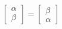 \documentclass[preview]{standalone}
\begin{document}
\begin{align*}
\begin{bmatrix} \alpha \\ \beta \end{bmatrix} = \begin{bmatrix} \beta \\ \alpha \end{bmatrix}
\end{align*}
\end{document}
